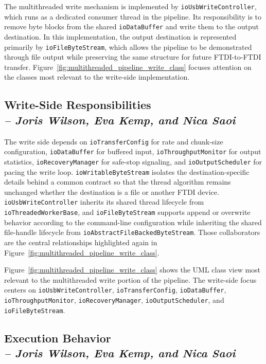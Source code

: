 The multithreaded write mechanism is implemented by \texttt{ioUsbWriteController}, which runs as a dedicated consumer thread in the pipeline. Its responsibility is to remove byte blocks from the shared \texttt{ioDataBuffer} and write them to the output destination. In this implementation, the output destination is represented primarily by \texttt{ioFileByteStream}, which allows the pipeline to be demonstrated through file output while preserving the same structure for future FTDI-to-FTDI transfer. Figure~\ref{fig:multithreaded_pipeline_write_class} focuses attention on the classes most relevant to the write-side implementation.

\subsection{Write-Side Responsibilities \\
\small{\textit{-- Joris Wilson, Eva Kemp, and Nica Saoi}}}
\label{Section::Write-Side Responsibilities}

The write side depends on \texttt{ioTransferConfig} for rate and chunk-size configuration, \texttt{ioDataBuffer} for buffered input, \texttt{ioThroughputMonitor} for output statistics, \texttt{ioRecoveryManager} for safe-stop signaling, and \texttt{ioOutputScheduler} for pacing the write loop. \texttt{ioWritableByteStream} isolates the destination-specific details behind a common contract so that the thread algorithm remains unchanged whether the destination is a file or another FTDI device. \texttt{ioUsbWriteController} inherits its shared thread lifecycle from \texttt{ioThreadedWorkerBase}, and \texttt{ioFileByteStream} supports append or overwrite behavior according to the command-line configuration while inheriting the shared file-handle lifecycle from \texttt{ioAbstractFileBackedByteStream}. Those collaborators are the central relationships highlighted again in Figure~\ref{fig:multithreaded_pipeline_write_class}.

Figure~\ref{fig:multithreaded_pipeline_write_class} shows the UML class view most relevant to the multithreaded write portion of the pipeline. The write-side focus centers on \texttt{ioUsbWriteController}, \texttt{ioTransferConfig}, \texttt{ioDataBuffer}, \texttt{ioThroughputMonitor}, \texttt{ioRecoveryManager}, \texttt{ioOutputScheduler}, and \texttt{ioFileByteStream}.

\subsection{Execution Behavior \\
\small{\textit{-- Joris Wilson, Eva Kemp, and Nica Saoi}}}
\label{Section::Write-Side Execution Behavior}


